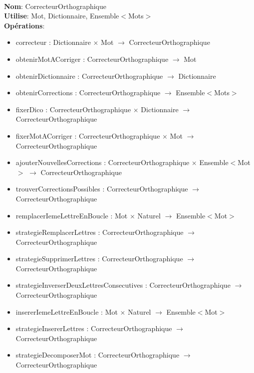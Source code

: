 \documentclass{article}
\begin{document}
    \noindent
    \\
    \textbf{Nom}: CorrecteurOrthographique \\
    \textbf{Utilise}: Mot, Dictionnaire, Ensemble$<$Mots$>$ \\
    \textbf{Opérations}: \begin{itemize}[label=$\ $, leftmargin=2cm, itemsep=0cm]
        \item correcteur : Dictionnaire $\times$ Mot $\rightarrow$ CorrecteurOrthographique
        \item obtenirMotACorriger : CorrecteurOrthographique $\rightarrow$ Mot
        \item obtenirDictionnaire : CorrecteurOrthographique $\rightarrow$ Dictionnaire
        \item obtenirCorrections : CorrecteurOrthographique $\rightarrow$ Ensemble$<$Mots$>$
        \item fixerDico : CorrecteurOrthographique $\times$ Dictionnaire $\rightarrow$ CorrecteurOrthographique
        \item fixerMotACorriger : CorrecteurOrthographique $\times$ Mot $\rightarrow$ CorrecteurOrthographique
        \item ajouterNouvellesCorrections : CorrecteurOrthographique $\times$ Ensemble$<$Mot$>$ $\rightarrow$ CorrecteurOrthographique
        \item trouverCorrectionsPossibles : CorrecteurOrthographique $\rightarrow$ CorrecteurOrthographique
        \item remplacerIemeLettreEnBoucle : Mot $\times$ Naturel $\rightarrow$ Ensemble$<$Mot$>$
        \item strategieRemplacerLettres : CorrecteurOrthographique $\rightarrow$ CorrecteurOrthographique
        \item strategieSupprimerLettres : CorrecteurOrthographique $\rightarrow$ CorrecteurOrthographique
        \item strategieInverserDeuxLettresConsecutives : CorrecteurOrthographique $\rightarrow$ CorrecteurOrthographique
        \item insererIemeLettreEnBoucle : Mot $\times$ Naturel $\rightarrow$ Ensemble$<$Mot$>$
        \item strategieInsererLettres : CorrecteurOrthographique $\rightarrow$ CorrecteurOrthographique
        \item strategieDecomposerMot : CorrecteurOrthographique $\rightarrow$ CorrecteurOrthographique
    \end{itemize}
\end{document}
